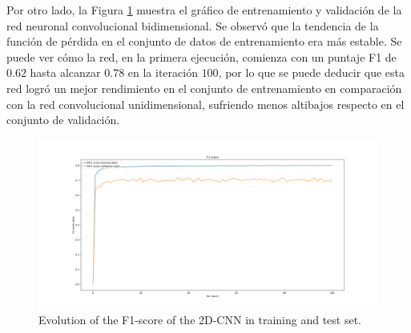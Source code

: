 \documentclass{uathesis-es}
\begin{document}
Por otro lado, la Figura \ref{F1ScoreEvolution:2D} muestra el gráfico de entrenamiento y validación de la red neuronal convolucional bidimensional. Se observó que la tendencia de la función de pérdida en el conjunto de datos de entrenamiento era más estable. Se puede ver cómo la red, en la primera ejecución, comienza con un puntaje F1 de $0.62$ hasta alcanzar $0.78$ en la iteración $100$, por lo que se puede deducir que esta red logró un mejor rendimiento en el conjunto de entrenamiento en comparación con la red convolucional unidimensional, sufriendo menos altibajos respecto en el conjunto de validación.

\begin{figure}[H]
	\centering
	\includegraphics[width=14cm]{Figures/1stPaper/F1Score2D}
	\caption{Evolution of the F1-score of the 2D-CNN in training and test set.}
	\label{F1ScoreEvolution:2D}
\end{figure}
\end{document}
